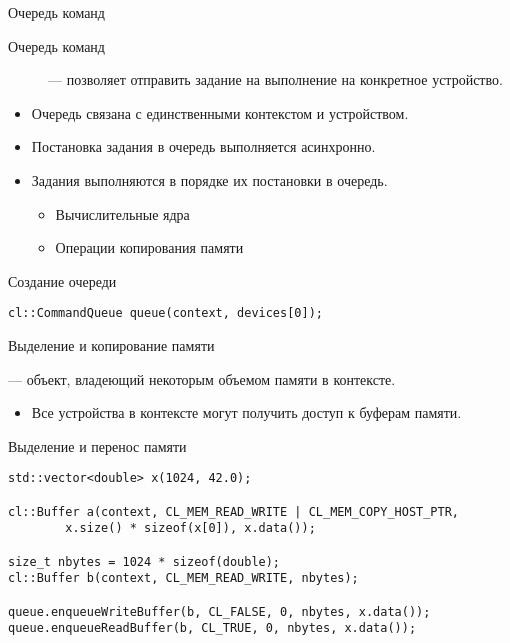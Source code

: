 \documentclass[@BEAMER_OPTIONS@]{beamer}
\begin{document}
\begin{frame}[fragile]{Очередь команд}
    \begin{description}
        \item[Очередь команд] --- позволяет отправить задание на выполнение на
            конкретное устройство.
    \end{description}
    \begin{itemize}
        \item Очередь связана с единственными контекстом и устройством.
        \item Постановка задания в очередь выполняется асинхронно.
        \item Задания выполняются в порядке их постановки в очередь.
            \begin{itemize}
                \item Вычислительные ядра
                \item Операции копирования памяти
            \end{itemize}
    \end{itemize}
    \begin{exampleblock}{Создание очереди}
        \begin{lstlisting}
cl::CommandQueue queue(context, devices[0]);
        \end{lstlisting}
    \end{exampleblock}
\end{frame}

\begin{frame}[fragile]{Выделение и копирование памяти}
    \begin{description}[\;\;]
        \item[Буфер памяти] --- объект, владеющий некоторым объемом памяти в
            контексте.
            \begin{itemize}
                \item Все устройства в контексте могут получить доступ к
                    буферам памяти.
            \end{itemize}
    \end{description}
    \begin{exampleblock}{Выделение и перенос памяти}
        \begin{lstlisting}
std::vector<double> x(1024, 42.0);

cl::Buffer a(context, CL_MEM_READ_WRITE | CL_MEM_COPY_HOST_PTR,
        x.size() * sizeof(x[0]), x.data());

size_t nbytes = 1024 * sizeof(double);
cl::Buffer b(context, CL_MEM_READ_WRITE, nbytes);

queue.enqueueWriteBuffer(b, CL_FALSE, 0, nbytes, x.data());
queue.enqueueReadBuffer(b, CL_TRUE, 0, nbytes, x.data());
        \end{lstlisting}
    \end{exampleblock}
\end{frame}
\end{document}
